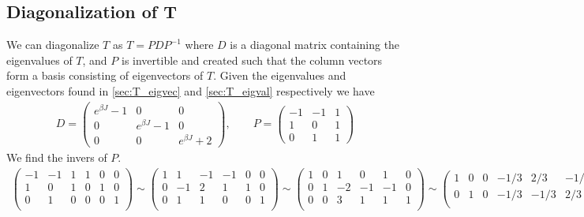 \documentclass[reprint, amsmath, amssymb, aps, onecolumn]{revtex4-2}
\begin{document}
{{\subsection{Diagonalization of T}\label{sec:T_diag}
\noindent We can diagonalize $T$ as $T=PDP^{-1}$ where $D$ is a diagonal matrix containing the eigenvalues of $T$, and $P$ is invertible and created such that the column vectors form a basis consisting of eigenvectors of $T$. Given the eigenvalues and eigenvectors found in \ref{sec:T_eigvec} and \ref{sec:T_eigval} respectively we have 
\begin{align*}
  D =  \begin{pmatrix}
       e^{\beta J} - 1 & 0 & 0 \\
       0 & e^{\beta J} - 1 & 0 \\
       0 & 0 & e^{\beta J} + 2
       \end{pmatrix}, 
       \qquad 
  P = \begin{pmatrix}
      -1 & -1 & 1 \\
       1 & 0 & 1 \\
      0 & 1 & 1
      \end{pmatrix}  
\end{align*}
We find the invers of $P$.
\begin{align*}
    \left(\begin{array}{ccc|ccc}
    -1 & -1 & 1  & 1 & 0 & 0 \\
    1  & 0  & 1  & 0 & 1 & 0 \\
    0  & 1  & 0  & 0 & 0 & 1 \\
    \end{array}\right)
    \sim 
    \left(\begin{array}{ccc|ccc}
    1 & 1  & -1 & -1 & 0 & 0 \\
    0 & -1 & 2  & 1  & 1 & 0 \\
    0 & 1  & 1  & 0  & 0 & 1 \\
    \end{array}\right)
    \sim   
    \left(\begin{array}{ccc|ccc}
    1 & 0  & 1 & 0 & 1 & 0 \\
    0 & 1 & -2  & -1  & -1 & 0 \\
    0 & 0  & 3  & 1  & 1 & 1 \\
    \end{array}\right)
    \sim   
    \left(\begin{array}{ccc|ccc}
    1 & 0 & 0  & -1/3 & 2/3 & -1/3 \\
    0 & 1 & 0  & -1/3  & -1/3 & 2/3 \\

\end{array}
\end{align*}}}
\end{document}
